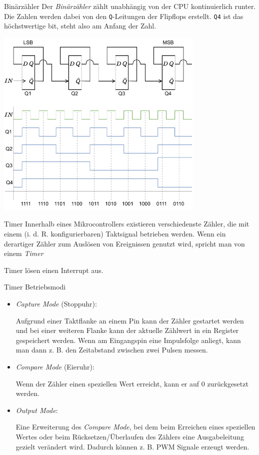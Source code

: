 \begin{defi}{Binärzähler}
    Der \emph{Binärzähler} zählt unabhängig von der CPU kontinuierlich runter.
    Die Zahlen werden dabei von den \texttt{Q}-Leitungen der Flipflops erstellt.
    \texttt{Q4} ist das höchstwertige bit, steht also am Anfang der Zahl.

    \begin{center}
        \includegraphics[width=0.75\textwidth]{includes/figures/defi_binaerzaehler.pdf}
    \end{center}
\end{defi}

\begin{defi}{Timer}
    Innerhalb eines Mikrocontrollers existieren verschiedenste Zähler, die mit einem (i. d. R. konfigurierbaren) Taktsignal betrieben werden.
    Wenn ein derartiger Zähler zum Auslösen von Ereignissen genutzt wird, spricht man von einem \emph{Timer}

    Timer lösen einen Interrupt aus.
\end{defi}

\begin{defi}{Timer Betriebsmodi}
    \begin{itemize}
        \item \emph{Capture Mode} (Stoppuhr):

              Aufgrund einer Taktflanke an einem Pin kann der Zähler gestartet werden und bei einer weiteren Flanke kann der aktuelle Zählwert in ein Register gespeichert werden.
              Wenn am Eingangspin eine Impulsfolge anliegt, kann man dann z. B. den Zeitabstand zwischen zwei Pulsen messen.
        \item \emph{Compare Mode} (Eieruhr):

              Wenn der Zähler einen speziellen Wert erreicht, kann er auf 0 zurückgesetzt werden.
        \item \emph{Output Mode}:

              Eine Erweiterung des \emph{Compare Mode}, bei dem beim Erreichen eines speziellen Wertes oder beim Rücksetzen/Überlaufen des Zählers eine Ausgabeleitung gezielt verändert wird.
              Dadurch können z. B. PWM Signale erzeugt werden.
    \end{itemize}
\end{defi}

